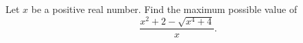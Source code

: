 Let $x$ be a positive real number. Find the maximum possible value of \[\frac{x^2+2-\sqrt{x^4+4}}{x}.\]
